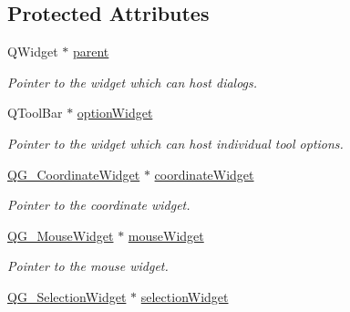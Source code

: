 \subsection*{Protected Attributes}
\begin{DoxyCompactItemize}
\item 
\hypertarget{classQG__DialogFactory_a3f4a0e132723a8da0aaac5c1f8bab7dd}{Q\-Widget $\ast$ \hyperlink{classQG__DialogFactory_a3f4a0e132723a8da0aaac5c1f8bab7dd}{parent}}\label{classQG__DialogFactory_a3f4a0e132723a8da0aaac5c1f8bab7dd}

\begin{DoxyCompactList}\small\item\em Pointer to the widget which can host dialogs. \end{DoxyCompactList}\item 
\hypertarget{classQG__DialogFactory_a7850e8ea2aef2336e99e234bb88920a3}{Q\-Tool\-Bar $\ast$ \hyperlink{classQG__DialogFactory_a7850e8ea2aef2336e99e234bb88920a3}{option\-Widget}}\label{classQG__DialogFactory_a7850e8ea2aef2336e99e234bb88920a3}

\begin{DoxyCompactList}\small\item\em Pointer to the widget which can host individual tool options. \end{DoxyCompactList}\item 
\hypertarget{classQG__DialogFactory_a3b5f0235594b099a9c88c908f76e54ce}{\hyperlink{classQG__CoordinateWidget}{Q\-G\-\_\-\-Coordinate\-Widget} $\ast$ \hyperlink{classQG__DialogFactory_a3b5f0235594b099a9c88c908f76e54ce}{coordinate\-Widget}}\label{classQG__DialogFactory_a3b5f0235594b099a9c88c908f76e54ce}

\begin{DoxyCompactList}\small\item\em Pointer to the coordinate widget. \end{DoxyCompactList}\item 
\hypertarget{classQG__DialogFactory_a143dbad01a134583bf41b825bb59d636}{\hyperlink{classQG__MouseWidget}{Q\-G\-\_\-\-Mouse\-Widget} $\ast$ \hyperlink{classQG__DialogFactory_a143dbad01a134583bf41b825bb59d636}{mouse\-Widget}}\label{classQG__DialogFactory_a143dbad01a134583bf41b825bb59d636}

\begin{DoxyCompactList}\small\item\em Pointer to the mouse widget. \end{DoxyCompactList}\item 
\hypertarget{classQG__DialogFactory_ae21a410c7b9b948a94714f1716a15e48}{\hyperlink{classQG__SelectionWidget}{Q\-G\-\_\-\-Selection\-Widget} $\ast$ \hyperlink{classQG__DialogFactory_ae21a410c7b9b948a94714f1716a15e48}{selection\-Widget}}\label{classQG__DialogFactory_ae21a410c7b9b948a94714f1716a15e48}


\end{DoxyCompactItemize}
